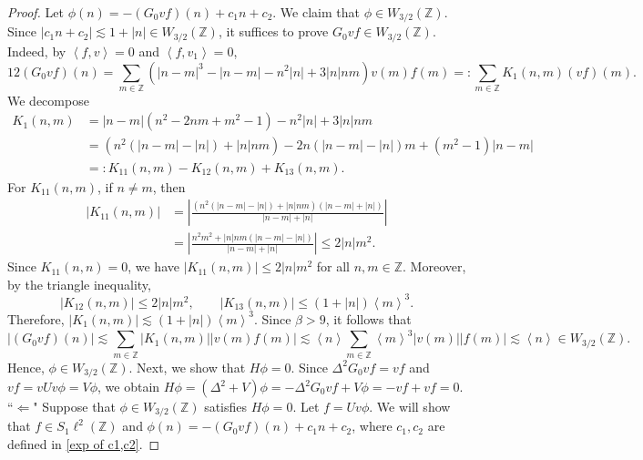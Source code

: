 \documentclass[reqno, 11pt]{amsart}
\newcommand\Z{\mathbb{Z}}
\numberwithin{equation}{section}
\begin{document}
\begin{proof}
 Let $\phi(n)=-(G_0vf)(n)+c_1n+c_2$. We claim that $\phi\in W_{3/2}(\Z)$. Since $|c_1n+c_2|\lesssim1+|n|\in W_{3/2}(\Z)$, it suffices to prove $G_0vf\in W_{3/2}(\Z)$. Indeed, by $\left<f,v\right>=0$ and $\left<f,v_1\right>=0$, 
 \begin{equation*}
 12(G_0vf)(n)=\sum\limits_{m\in\Z}^{}\left(|n-m|^3-|n-m|-n^2|n|+3|n|nm\right)v(m)f(m)=:\sum\limits_{m\in\Z}^{}K_1(n,m)(vf)(m).
 \end{equation*}
 We decompose 
 \begin{align*}
 K_1(n,m)&=|n-m|(n^2-2nm+m^2-1)-n^2|n|+3|n|nm\\
 &=\left(n^2(|n-m|-|n|)+|n|nm\right)-2n(|n-m|-|n|)m+(m^2-1)|n-m|\\
 &=:K_{11}(n,m)-K_{12}(n,m)+K_{13}(n,m).
 \end{align*}
 For $K_{11}(n,m)$, if $n\neq m$, then
 \begin{align*}
 |K_{11}(n,m)|&=\left|\frac{\left(n^2(|n-m|-|n|)+|n|nm\right)(|n-m|+|n|)}{|n-m|+|n|}\right|\\
 &=\left|\frac{n^2m^2+|n|nm(|n-m|-|n|)}{|n-m|+|n|}\right|\leq 2|n|m^2.
 \end{align*}
 Since $K_{11}(n,n)=0$, we have $|K_{11}(n,m)|\leq 2|n|m^2$ for all $n,m\in\Z$.
 Moreover, by the triangle inequality, 
 $$|K_{12}(n,m)|\leq 2|n|m^2,\qquad |K_{13}(n,m)|\leq (1+|n|)\left<m\right>^3.$$
 Therefore, $|K_1(n,m)|\lesssim (1+|n|)\left<m\right>^3 $. Since $\beta>9$, it follows that
  $$|(G_0vf)(n)|\lesssim \sum\limits_{m\in\Z}^{}|K_1(n,m)||v(m)f(m)|\lesssim \left<n\right>\sum\limits_{m\in\Z}^{}\left<m\right>^3|v(m)||f(m)|\lesssim \left<n\right>\in W_{3/2}(\Z). $$
Hence, $\phi\in W_{3/2}(\Z)$. Next, we show that $H\phi=0$. Since $\Delta^2G_0vf=vf$ and $vf=vUv\phi=V\phi$, we obtain $H\phi=(\Delta^2+V)\phi=-\Delta^2G_0vf+V\phi=-vf+vf=0.$
\vskip0.1cm
``$\bm{\Longleftarrow}$" Suppose that $\phi\in W_{3/2}(\Z)$ satisfies $H\phi=0$.  Let $f=Uv\phi$. We will show that $f\in S_1\ell^2(\Z)$ and $\phi(n)=-(G_0vf)(n)+c_1n+c_2$, where $c_1,c_2$ are defined in \eqref{exp of c1,c2}.


\end{proof}
\end{document}
